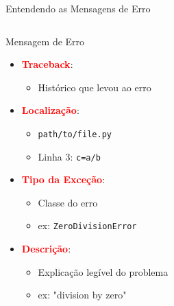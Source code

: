 \begin{frame}{Entendendo as Mensagens de Erro}
    \begin{columns}
        \begin{column}{0.5\textwidth}
            \begin{alertblock}{Mensagem de Erro}
                \begin{itemize}
                    \item \textcolor{red}{\textbf{Traceback}}:
                          \begin{itemize}
                              \small
                              \item Histórico que levou ao erro
                          \end{itemize}

                    \item \textcolor{red}{\textbf{Localização}}:
                          \begin{itemize}
                              \small
                              \item \texttt{path/to/file.py}
                              \item Linha 3: \texttt{c=a/b}
                          \end{itemize}

                    \item \textcolor{red}{\textbf{Tipo da Exceção}}:
                          \begin{itemize}
                              \small
                              \item Classe do erro
                              \item ex: \texttt{ZeroDivisionError}
                          \end{itemize}

                    \item \textcolor{red}{\textbf{Descrição}}:
                          \begin{itemize}
                              \small
                              \item Explicação legível do problema
                              \item ex: "division by zero"
                          \end{itemize}
                \end{itemize}
            \end{alertblock}



\end{column}
\end{columns}
\end{frame}
